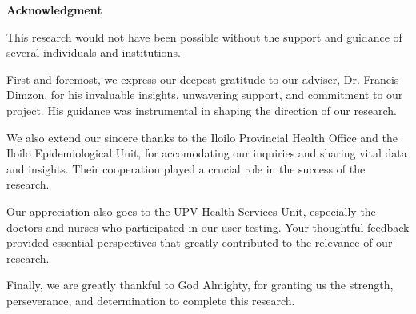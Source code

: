 \begin{center}
	\textbf{Acknowledgment}
\end{center}

This research would not have been possible without the support and guidance of several individuals and institutions.

First and foremost, we express our deepest gratitude to our adviser, Dr. Francis Dimzon, for his invaluable insights, unwavering support, and commitment to our project. His guidance was instrumental in shaping the direction of our research. 

We also extend our sincere thanks to the Iloilo Provincial Health Office and the Iloilo Epidemiological Unit, for accomodating our inquiries and sharing vital data and insights. Their cooperation played a crucial role in the success of the research. 

Our appreciation also goes to the UPV Health Services Unit, especially the doctors and nurses who participated in our user testing. Your thoughtful feedback provided essential perspectives that greatly contributed to the relevance of our research.

Finally, we are greatly thankful to God Almighty, for granting us the strength, perseverance, and determination to complete this research.